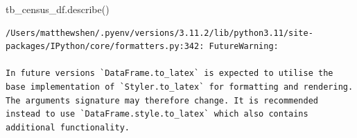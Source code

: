 \documentclass[
  letterpaper,
  DIV=11,
  numbers=noendperiod]{scrreprt}
\newenvironment{Shaded}{\begin{snugshade}}{\end{snugshade}}
\newcommand{\NormalTok}[1]{\textcolor[rgb]{0.00,0.23,0.31}{#1}}
\begin{document}
\begin{Shaded}
\begin{Highlighting}[]
\NormalTok{tb\_census\_df.describe()}
\end{Highlighting}
\end{Shaded}

\begin{verbatim}
/Users/matthewshen/.pyenv/versions/3.11.2/lib/python3.11/site-packages/IPython/core/formatters.py:342: FutureWarning:

In future versions `DataFrame.to_latex` is expected to utilise the base implementation of `Styler.to_latex` for formatting and rendering. The arguments signature may therefore change. It is recommended instead to use `DataFrame.style.to_latex` which also contains additional functionality.
\end{verbatim}
\end{document}
